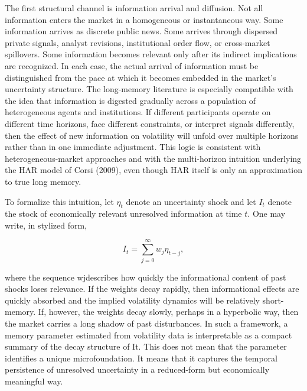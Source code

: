 \documentclass[12pt]{article}
\begin{document}
The first structural channel is information arrival and diffusion. Not all information enters the market in a homogeneous or instantaneous way. Some information arrives as discrete public news. Some arrives through dispersed private signals, analyst revisions, institutional order flow, or cross-market spillovers. Some information becomes relevant only after its indirect implications are recognized. In each case, the actual arrival of information must be distinguished from the pace at which it becomes embedded in the market's uncertainty structure. The long-memory literature is especially compatible with the idea that information is digested gradually across a population of heterogeneous agents and institutions. If different participants operate on different time horizons, face different constraints, or interpret signals differently, then the effect of new information on volatility will unfold over multiple horizons rather than in one immediate adjustment. This logic is consistent with heterogeneous-market approaches and with the multi-horizon intuition underlying the HAR model of Corsi (2009), even though HAR itself is only an approximation to true long memory.

To formalize this intuition, let $\eta_t$ denote an uncertainty shock and let $I_t$ denote the stock of economically relevant unresolved information at time $t$. One may write, in stylized form,

\[I_t = \sum_{j=0}^{\infty} w_j \eta_{t-j},\]

where the sequence wjdescribes how quickly the informational content of past shocks loses relevance. If the weights decay rapidly, then informational effects are quickly absorbed and the implied volatility dynamics will be relatively short-memory. If, however, the weights decay slowly, perhaps in a hyperbolic way, then the market carries a long shadow of past disturbances. In such a framework, a memory parameter estimated from volatility data is interpretable as a compact summary of the decay structure of It. This does not mean that the parameter identifies a unique microfoundation. It means that it captures the temporal persistence of unresolved uncertainty in a reduced-form but economically meaningful way.
\end{document}
